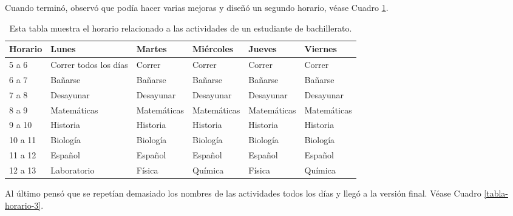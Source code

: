 \documentclass{article}
\begin{document}
Cuando terminó, observó que podía hacer varias mejoras y diseñó un segundo horario, véase Cuadro \ref{tabla-horario-2}.
\begin{table}[h] %
\centering
\begin{tabular}{m{2cm} m{2cm} m{2cm} m{2cm} m{2cm} m{2cm}}
\hline
\textbf{Horario} & \textbf{Lunes}  & \textbf{Martes} & \textbf{Miércoles} & \textbf{Jueves} & \textbf{Viernes} \\ 
\hline  
5 a 6   & Correr todos los días & Correr & Correr    & Correr & Correr\\
\hline 
6 a 7   & Bañarse & Bañarse & Bañarse    & Bañarse & Bañarse\\
\hline 
7 a 8   & Desayunar & Desayunar & Desayunar & Desayunar & Desayunar\\
\hline 
8 a 9   & Matemáticas & Matemáticas & Matemáticas & Matemáticas & Matemáticas\\
\hline 
9 a 10   & Historia & Historia & Historia & Historia & Historia\\
\hline 
10 a 11   & Biología & Biología & Biología & Biología & Biología\\
\hline 
11 a 12   & Español & Español & Español & Español & Español\\
\hline 
12 a 13   & Laboratorio & Física & Química    & Física & Química\\
\hline 
\end{tabular} 
\caption{Esta tabla muestra el horario relacionado a las actividades de un estudiante de bachillerato.}\label{tabla-horario-2}
\end{table}
Al último pensó que se repetían demasiado los nombres de las actividades todos los días y llegó a la versión final. Véase Cuadro \ref{tabla-horario-3}.
\end{document}
